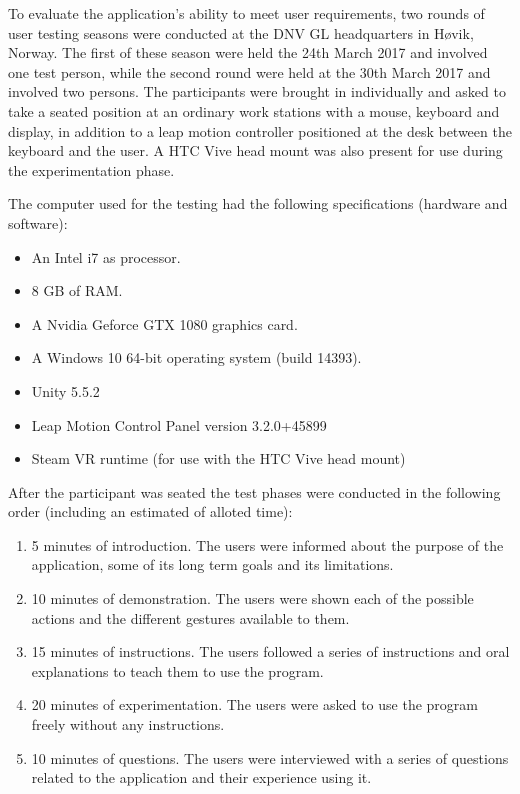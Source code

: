 To evaluate the application's ability to meet user requirements, two rounds of user testing seasons were conducted at the DNV GL headquarters in Høvik, Norway.
The first of these season were held the 24th March 2017 and involved one test person, while the second round were held at the 30th March 2017 and involved two persons. 
The participants were brought in individually and asked to take a seated position at an ordinary work stations with a mouse, keyboard and display, 
in addition to a leap motion controller positioned at the desk between the keyboard and the user. A HTC Vive head mount was also present for use during the experimentation phase. 

The computer used for the testing had the following specifications (hardware and software):
\begin{itemize}
    \item An Intel i7 as processor.
    \item 8 GB of RAM.
    \item A Nvidia Geforce GTX 1080 graphics card.
    \item A Windows 10 64-bit operating system (build 14393).
    \item Unity 5.5.2
    \item Leap Motion Control Panel version 3.2.0+45899
    \item Steam VR runtime (for use with the HTC Vive head mount)
\end{itemize}

After the participant was seated the test phases were conducted in the following order (including an estimated of alloted time):

\begin{enumerate}
    \item  5 minutes of introduction. The users were informed about the purpose of the application, some of its long term goals and its limitations.
    \item 10 minutes of demonstration. The users were shown each of the possible actions and the different gestures available to them.
    \item 15 minutes of instructions. The users followed a series of instructions and oral explanations to teach them to use the program.
    \item 20 minutes of experimentation. The users were asked to use the program freely without any instructions.  
    \item 10 minutes of questions. The users were interviewed with a series of questions related to the application and their experience using it.   
\end{enumerate}

